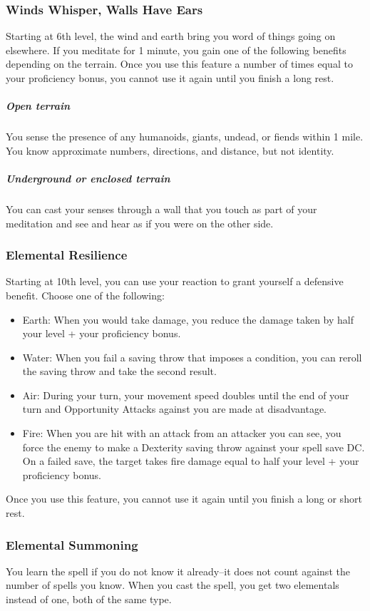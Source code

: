 \subsubsection{Winds Whisper, Walls Have Ears}
Starting at 6th level, the wind and earth bring you word of things going on elsewhere. If you meditate for 1 minute, you gain one of the following benefits depending on the terrain. Once you use this feature a number of times equal to your proficiency bonus, you cannot use it again until you finish a long rest.

\subparagraph*{Open terrain} You sense the presence of any humanoids, giants, undead, or fiends within 1 mile. You know approximate numbers, directions, and distance, but not identity.
\subparagraph*{Underground or enclosed terrain} You can cast your senses through a wall that you touch as part of your meditation and see and hear as if you were on the other side.

\subsubsection{Elemental Resilience}
Starting at 10th level, you can use your reaction to grant yourself a defensive benefit. Choose one of the following:
\begin{itemize}
	\item Earth: When you would take damage, you reduce the damage taken by half your level + your proficiency bonus.
	\item Water: When you fail a saving throw that imposes a condition, you can reroll the saving throw and take the second result.
	\item Air: During your turn, your movement speed doubles until the end of your turn and Opportunity Attacks against you are made at disadvantage.
	\item Fire: When you are hit with an attack from an attacker you can see, you force the enemy to make a Dexterity saving throw against your spell save DC. On a failed save, the target takes fire damage equal to half your level + your proficiency bonus.
\end{itemize}

Once you use this feature, you cannot use it again until you finish a long or short rest.

\subsubsection{Elemental Summoning}
You learn the  spell if you do not know it already--it does not count against the number of spells you know. When you cast the spell, you get two elementals instead of one, both of the same type.

